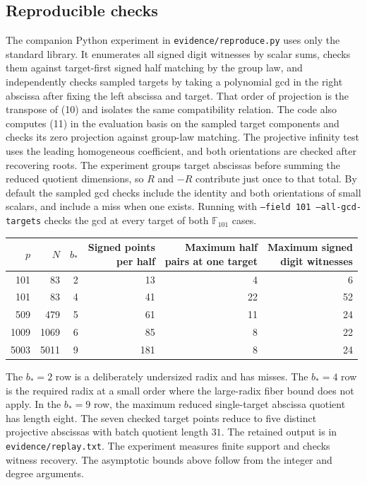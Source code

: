 \documentclass[11pt]{article}
\begin{document}
\subsection*{Reproducible checks}

The companion Python experiment in \texttt{evidence/reproduce.py} uses only the standard library. It enumerates all signed digit witnesses by scalar sums, checks them against target-first signed half matching by the group law, and independently checks sampled targets by taking a polynomial gcd in the right abscissa after fixing the left abscissa and target. That order of projection is the transpose of (10) and isolates the same compatibility relation. The code also computes (11) in the evaluation basis on the sampled target components and checks its zero projection against group-law matching. The projective infinity test uses the leading homogeneous coefficient, and both orientations are checked after recovering roots. The experiment groups target abscissas before summing the reduced quotient dimensions, so \(R\) and \(-R\) contribute just once to that total. By default the sampled gcd checks include the identity and both orientations of small scalars, and include a miss when one exists. Running with \texttt{--field 101 --all-gcd-targets} checks the gcd at every target of both \(\mathbb F_{101}\) cases.

\begin{center}
\begin{tabular}{@{}rrrrrr@{}}
\toprule
\(p\)&\(N\)&\(b_*\)&
\shortstack{Signed points\\per half}&
\shortstack{Maximum half\\pairs at one target}&
\shortstack{Maximum signed\\digit witnesses}\\
\midrule
101 & 83   & 2 & 13 & 4  & 6\\
101 & 83   & 4 & 41 & 22 & 52\\
509 & 479  & 5 & 61 & 11 & 24\\
1009& 1069 & 6 & 85 & 8  & 22\\
5003& 5011 & 9 & 181 & 8 & 24\\
\bottomrule
\end{tabular}
\end{center}

The \(b_*=2\) row is a deliberately undersized radix and has misses. The \(b_*=4\) row is the required radix at a small order where the large-radix fiber bound does not apply. In the \(b_*=9\) row, the maximum reduced single-target abscissa quotient has length eight. The seven checked target points reduce to five distinct projective abscissas with batch quotient length \(31\). The retained output is in \texttt{evidence/replay.txt}. The experiment measures finite support and checks witness recovery. The asymptotic bounds above follow from the integer and degree arguments.
\end{document}
